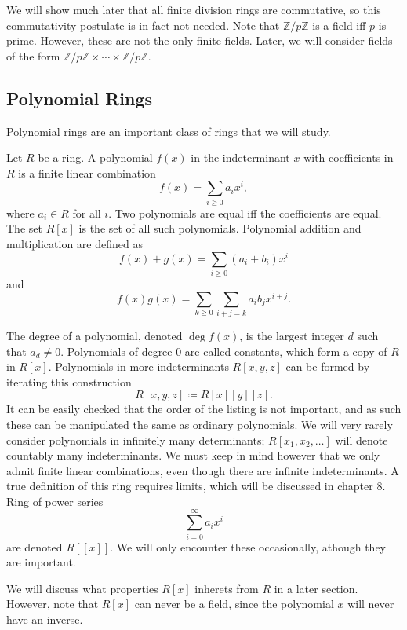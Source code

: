 We will show much later that all finite division rings are commutative, so this commutativity postulate is in fact not needed. Note that $\mathbb{Z} / p\mathbb{Z}$ is a field iff $p$ is prime. However, these are not the only finite fields. Later, we will consider fields of the form $\mathbb{Z}/p\mathbb{Z} \times \cdots \times \mathbb{Z}/p\mathbb{Z}$.
\subsection{Polynomial Rings}
Polynomial rings are an important class of rings that we will study.
\begin{definition}\label{dfn:3.1.8}
	Let $R$ be a ring. A polynomial $f(x)$ in the indeterminant $x$ with coefficients in $R$ is a finite linear combination
	\[
		f(x)=\sum_{i\geq 0} a_ix^i
	,\]
	where $a_i\in R$ for all $i$. Two polynomials are equal iff the coefficients are equal. The set  $R[x]$ is the set of all such polynomials. Polynomial addition and multiplication are defined as
	\[
		f(x)+g(x)=\sum_{i\geq 0} (a_i+b_i)x^i
	\]
	and
	\[
		f(x)g(x)=\sum_{k\geq 0} \sum_{i+j=k} a_ib_j x^{i+j}
	.\]
	
\end{definition}

The degree of a polynomial, denoted $\operatorname{deg}f(x)$, is the largest integer $d$ such that $a_d\neq 0$. Polynomials of degree 0 are called constants, which form a copy of $R$ in $R[x]$. Polynomials in more indeterminants $R[x,y,z]$ can be formed by iterating this construction
\[
	R[x,y,z]\coloneqq R[x][y][z]
.\]
It can be easily checked that the order of the listing is not important, and as such these can be manipulated the same as ordinary polynomials. We will very rarely consider polynomials in infinitely many determinants; $R[x_1,x_2, \ldots]$ will denote countably many indeterminants. We must keep in mind however that we only admit finite linear combinations, even though there are infinite indeterminants. A true definition of this ring requires limits, which will be discussed in chapter 8. Ring of power series
\[
	\sum_{i=0}^{\infty} a_ix^i
\]
are denoted $R[[x]]$. We will only encounter these occasionally, athough they are important.

We will discuss what properties $R[x]$ inherets from $R$ in a later section. However, note that $R[x]$ can never be a field, since the polynomial $x$ will never have an inverse.

